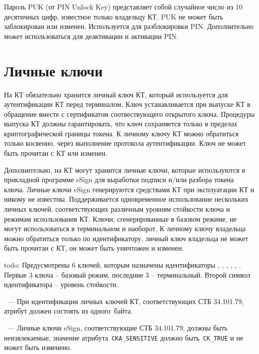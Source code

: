 Пароль PUK (от PIN Unlock Key) представляет собой случайное число из 10 
десятичных цифр, известное только владельцу КТ. PUK не может быть заблокирован 
или изменен. Используется для разблокировки PIN. Дополнительно может использоваться 
для деактивации и активации PIN.

\section{Личные ключи}\label{OBJ.Keys}

На КТ обязательно хранится личный ключ КТ, который используется 
для аутентификации КТ перед терминалом. Ключ устанавливается при выпуске
КТ в обращение вместе с сертификатом соотвествующего открытого ключа. 
Процедуры выпуска КТ должны гарантировать, что ключ сохраняется только в 
пределах криптографической границы токена. К личному ключу КТ можно обратиться 
только косвенно, через выполнение протокола аутентификации. Ключ не может быть 
прочитан с КТ или изменен. 

Дополнительно, на КТ могут хранится личные ключи, 
которые используются в прикладной программе eSign для выработки 
подписи и/или разбора токена ключа.
Личные ключи eSign генерируются средствами КТ при эксплуатации
КТ и никому не известны. 
Поддерживается одновременное использование нескольких личных ключей, 
соответствующих различным уровням стойкости ключа и режимам
использования КТ.
Ключи, сгенерированные в базовом режиме, не могут использоваться 
в терминальном и наоборот.
К личному ключу владельца можно обратиться только по идентификатору, 
личный ключ владельца не может быть прочитан с КТ, 
он может быть уничтожен и изменен.

todo: 
Предусмотрены 6 ключей, которым назначены идентификаторы 
, , , , , .
Первые 3 ключа -- базовый режим, последние 3 -- терминальный.
Второй символ идентификатора -- уровень стойкости.

\begin{note}
~---
При идентификации личных ключей КТ, соответствующих СТБ 34.101.79,
атрибут должен состоять из одного~байта.
\end{note}

\begin{note}
~---
Личные ключи eSign, соответствующие СТБ 34.101.79, должны быть неизвлекаемые,
значение атрибута~\verb|CKA_SENSITIVE| должно быть~\verb|CK_TRUE| и
не может быть изменено.
\end{note}


